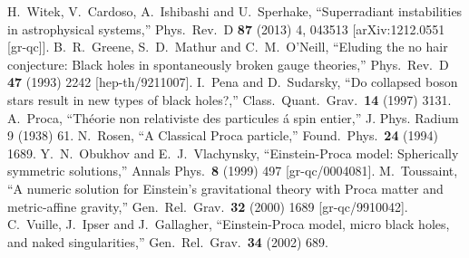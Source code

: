 \begin{small}
\begin{thebibliography}{99}
  H.~Witek, V.~Cardoso, A.~Ishibashi and U.~Sperhake,
  ``Superradiant instabilities in astrophysical systems,''
  Phys.\ Rev.\ D {\bf 87} (2013) 4,  043513
  [arXiv:1212.0551 [gr-qc]].
  B.~R.~Greene, S.~D.~Mathur and C.~M.~O'Neill,
  ``Eluding the no hair conjecture: Black holes in spontaneously broken gauge theories,''
  Phys.\ Rev.\ D {\bf 47} (1993) 2242
  [hep-th/9211007].
  I.~Pena and D.~Sudarsky,
  ``Do collapsed boson stars result in new types of black holes?,''
  Class.\ Quant.\ Grav.\  {\bf 14} (1997) 3131.
A.~Proca,   
``Th\'eorie non relativiste des particules  \'a spin entier,''
J. Phys. Radium 9 (1938) 61.
  N.~Rosen,
  ``A Classical Proca particle,''
  Found.\ Phys.\  {\bf 24} (1994) 1689.
  Y.~N.~Obukhov and E.~J.~Vlachynsky,
  ``Einstein-Proca model: Spherically symmetric solutions,''
  Annals Phys.\  {\bf 8} (1999) 497
  [gr-qc/0004081].
  M.~Toussaint,
  ``A numeric solution for Einstein's gravitational theory with Proca matter and metric-affine gravity,''
  Gen.\ Rel.\ Grav.\  {\bf 32} (2000) 1689
  [gr-qc/9910042].
  C.~Vuille, J.~Ipser and J.~Gallagher,
  ``Einstein-Proca model, micro black holes, and naked singularities,''
  Gen.\ Rel.\ Grav.\  {\bf 34} (2002) 689.

\end{thebibliography}
\end{small}
